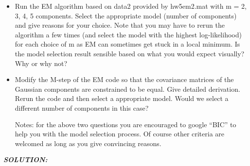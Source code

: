 \documentclass{article}
\theoremstyle{definition}
\theoremstyle{definition}
\theoremstyle{remark}
\begin{document}
\begin{itemize}
  \item Run the EM algorithm based on data2 provided by hw5em2.mat with m =
2, 3, 4, 5 components. Select the appropriate model (number of components) and give reasons for your choice. Note that you may have to rerun the algorithm a few times
(and select the model with the highest log-likelihood) for each choice of m as EM can
sometimes get stuck in a local minimum. Is the model selection result sensible based
on what you would expect visually? Why or why not?
  \item Modify the M-step of the EM code so that the covariance matrices of
the Gaussian components are constrained to be equal. Give detailed derivation. Rerun the code and then select a appropriate model. Would we select a different number of components in this case?

Notes: for the above two questions you are encouraged to google ``BIC'' to help you with the model selection process. Of course other criteria are welcomed as long as you give convincing reasons.
\end{itemize}
\emph{\textbf{SOLUTION:}}
\end{document}
